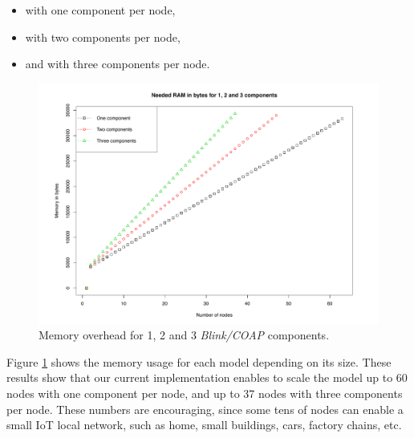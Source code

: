 \begin{itemize}
	\item with one component per node, 
	\item with two components per node,
	\item and with three components per node.
\end{itemize}

\begin{figure}[h]
	\centering
	\includegraphics[width=1\columnwidth]{chapters/intra-node.images/memoryOverhead3NodesRemb.pdf}
	\caption{Memory overhead for 1, 2 and 3 \emph{Blink/COAP} components.} \label{fig:MemUsedBlinkComps}
\end{figure}


Figure \ref{fig:MemUsedBlinkComps} shows the memory usage for each model depending on its size.
These results show that our current implementation enables to scale the model up to 60 nodes with one component per node, and up to 37 nodes with three components per node. These numbers are encouraging, since some tens of nodes can enable a small IoT local network, such as home, small buildings, cars, factory chains, etc.


